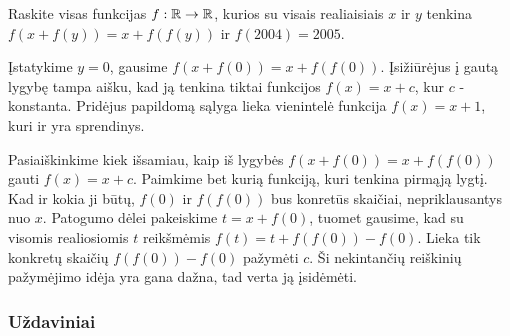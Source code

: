 \begin{pavnr}
  Raskite visas funkcijas $f:\mathbb R \to \mathbb R$, kurios su visais realiaisiais $x$
  ir $y$ tenkina $f(x+f(y))=x+f(f(y))$ ir $f(2004)=2005$.
\end{pavnr}

\begin{sprendimas} Įstatykime $y=0$, gausime $f(x+f(0)) = x + f(f(0))$.
  Įsižiūrėjus į gautą lygybę tampa aišku, kad ją tenkina tiktai funkcijos
  $f(x)=x+c$, kur $c$ - konstanta.  Pridėjus papildomą sąlyga lieka
  vienintelė funkcija $f(x)=x+1$, kuri ir yra sprendinys.
\end{sprendimas}

Pasiaiškinkime kiek išsamiau, kaip iš lygybės $f(x + f(0)) = x + f(f(0))$
gauti $f(x) = x+c$. Paimkime bet kurią funkciją, kuri tenkina pirmąją
lygtį. Kad ir kokia ji būtų, $f(0)$ ir $f(f(0))$ bus konretūs skaičiai,
nepriklausantys nuo $x$. Patogumo dėlei pakeiskime $t=x+f(0)$, tuomet
gausime, kad su visomis realiosiomis $t$ reikšmėmis $f(t) = t + f(f(0)) -
f(0)$. Lieka tik konkretų skaičių $f(f(0)) - f(0)$ pažymėti $c$. Ši
nekintančių reiškinių pažymėjimo idėja yra gana dažna, tad verta ją
įsidėmėti.

\subsubsection{Uždaviniai}

